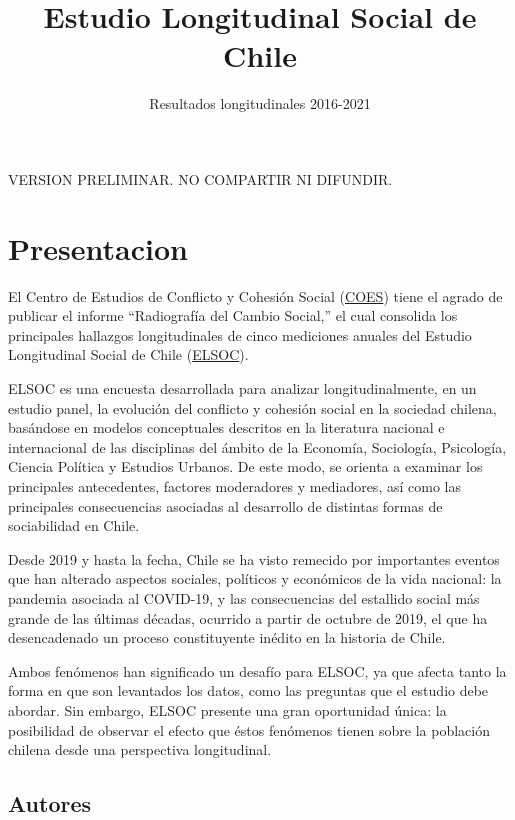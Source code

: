 \documentclass[
  12pt,
]{book}
\title{Estudio Longitudinal Social de Chile}
\subtitle{Resultados longitudinales 2016-2021}
\author{}
\date{\vspace{-2.5em}}
\begin{document}
\maketitle

{
\hypersetup{linkcolor=}
\setcounter{tocdepth}{1}
\tableofcontents
}
\listoftables
\listoffigures
{}
VERSION PRELIMINAR. NO COMPARTIR NI DIFUNDIR.

\hypertarget{presentacion}{%
\chapter*{Presentacion}\label{presentacion}}

El Centro de Estudios de Conflicto y Cohesión Social (\href{https://coes.cl/}{COES}) tiene el agrado de publicar el informe ``Radiografía del Cambio Social,'' el cual consolida los principales hallazgos longitudinales de cinco mediciones anuales del Estudio Longitudinal Social de Chile (\href{https://coes.cl/encuesta-panel/}{ELSOC}).

ELSOC es una encuesta desarrollada para analizar longitudinalmente, en un estudio panel, la evolución del conflicto y cohesión social en la sociedad chilena, basándose en modelos conceptuales descritos en la literatura nacional e internacional de las disciplinas del ámbito de la Economía, Sociología, Psicología, Ciencia Política y Estudios Urbanos. De este modo, se orienta a examinar los principales antecedentes, factores moderadores y mediadores, así como las principales consecuencias asociadas al desarrollo de distintas formas de sociabilidad en Chile.

Desde 2019 y hasta la fecha, Chile se ha visto remecido por importantes eventos que han alterado aspectos sociales, políticos y económicos de la vida nacional: la pandemia asociada al COVID-19, y las consecuencias del estallido social más grande de las últimas décadas, ocurrido a partir de octubre de 2019, el que ha desencadenado un proceso constituyente inédito en la historia de Chile.

Ambos fenómenos han significado un desafío para ELSOC, ya que afecta tanto la forma en que son levantados los datos, como las preguntas que el estudio debe abordar. Sin embargo, ELSOC presente una gran oportunidad única: la posibilidad de observar el efecto que éstos fenómenos tienen sobre la población chilena desde una perspectiva longitudinal.

\hypertarget{autores}{%
\section*{Autores}\label{autores}}
\end{document}
